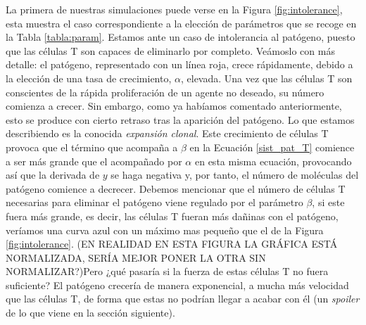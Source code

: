 La primera de nuestras simulaciones puede verse en la Figura \ref{fig:intolerance}, esta muestra el caso correspondiente a la elección de parámetros que se recoge en la Tabla \ref{tabla:param}. Estamos ante un caso de intolerancia al patógeno, puesto que las células T son capaces de eliminarlo por completo. Veámoslo con más detalle: el patógeno, representado con un línea roja, crece rápidamente, debido a la elección de una tasa de crecimiento, $\alpha$, elevada. Una vez que las células T son conscientes de la rápida proliferación de un agente no deseado, su número comienza a crecer. Sin embargo, como ya habíamos comentado anteriormente, esto se produce con cierto retraso tras la aparición del patógeno. Lo que estamos describiendo es la conocida \textit{expansión clonal}. Este crecimiento de células T provoca que el término que acompaña a $\beta$ en la Ecuación \ref{sist_pat_T} comience a ser más grande que el acompañado por $\alpha$ en esta misma ecuación, provocando así que la derivada de $y$ se haga negativa y, por tanto, el número de moléculas del patógeno comience a decrecer. Debemos mencionar que el número de células T necesarias para eliminar el patógeno viene regulado por el parámetro $\beta$, si este fuera más grande, es decir, las células T fueran más dañinas con el patógeno, veríamos una curva azul con un máximo mas pequeño que el de la Figura \ref{fig:intolerance}. (EN REALIDAD EN ESTA FIGURA LA GRÁFICA ESTÁ NORMALIZADA, SERÍA MEJOR PONER LA OTRA SIN NORMALIZAR?)Pero ¿qué pasaría si la fuerza de estas células T no fuera suficiente? El patógeno crecería de manera exponencial, a mucha más velocidad que las células T, de forma que estas no podrían llegar a acabar con él (un \textit{spoiler} de lo que viene en la sección siguiente).


